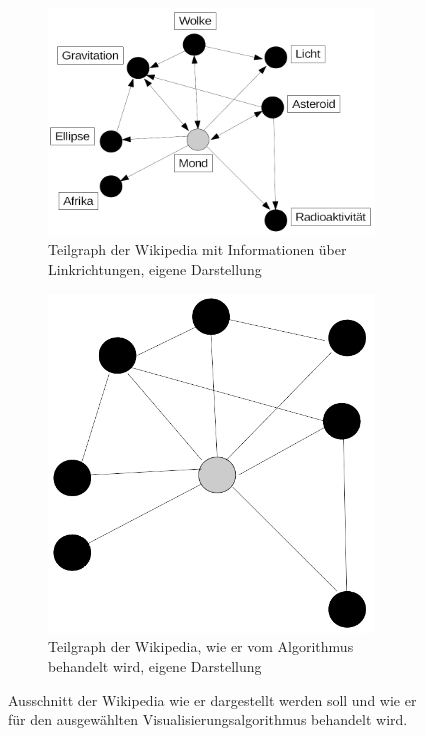 \documentclass[12pt, a4paper]{article}
\begin{document}
\begin{figure}[h!]
\centering
\begin{subfigure}[t]{0.55\textwidth}
\centering
\includegraphics[width=0.95\textwidth]{exampleMondDirection.png}
\caption[Teilgraph der Wikipedia mit Informationen über Linkrichtungen]{Teilgraph der Wikipedia mit Informationen über Linkrichtungen, eigene Darstellung}
\label{exampleMondDirection}
\end{subfigure}\hfill
\begin{subfigure}[t]{0.35\textwidth}
\centering
\includegraphics[width=0.95\textwidth]{exampleMondNoDirection_noLabels.png}
\caption[Teilgraph der Wikipedia, wie er vom Algorithmus behandelt wird]{Teilgraph der Wikipedia, wie er vom Algorithmus behandelt wird, eigene Darstellung}
\label{exampleMondNoDirection_noLabels}
\end{subfigure}
\caption{Ausschnitt der Wikipedia wie er dargestellt werden soll und wie er für den ausgewählten Visualisierungsalgorithmus behandelt wird.}
\label{exampleMond}
\end{figure}
\end{document}
